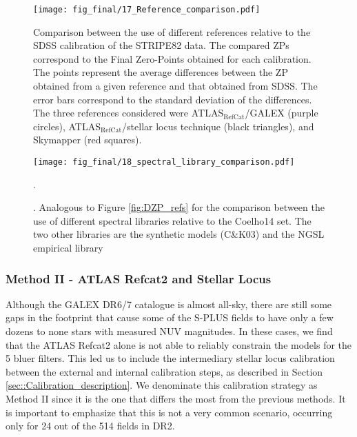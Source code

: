 \documentclass[fleqn,usenatbib]{mnras}
\begin{document}
\begin{figure}
\begin{center}
\texttt{[image: fig\_final/17\_Reference\_comparison.pdf]}
\caption{\label{fig:DZP_refs} Comparison between the use of different references relative to the SDSS calibration of the STRIPE82 data. The compared ZPs correspond to the Final Zero-Points obtained for each calibration. The points represent the average differences between the ZP obtained from a given reference and that obtained from SDSS. The error bars correspond to the standard deviation of the differences. The three references considered were ATLAS$_\mathrm{RefCat}$/GALEX (purple circles), ATLAS$_\mathrm{RefCat}$/stellar locus technique (black triangles), and Skymapper (red squares).}
\label{fig:ref_comp_final}
\end{center}
\end{figure}

\begin{figure}
\begin{center}
\texttt{[image: fig\_final/18\_spectral\_library\_comparison.pdf]}
\caption{\label{fig:DZP_models}. Analogous to Figure \ref{fig:DZP_refs} for the comparison between the use of different spectral libraries relative to the Coelho14 set. The two other libraries are the \citep{Castelli+Kurucz2003} synthetic models (C\&K03) and the NGSL empirical library}.
\label{fig:mod_comp_partial}
\end{center}
\end{figure}

\subsubsection{Method II - ATLAS Refcat2 and Stellar Locus}

Although the GALEX DR6/7 catalogue is almost all-sky, there are still some gaps in the footprint that cause some of the S-PLUS fields to have only a few dozens to none stars with measured NUV magnitudes. In these cases, we find that the ATLAS Refcat2 alone is not able to reliably constrain the models for the 5 bluer filters. This led us to include the intermediary stellar locus calibration between the external and internal calibration steps, as described in Section \ref{sec::Calibration_description}. We denominate this calibration strategy as Method II since it is the one that differs the most from the previous methods. It is important to emphasize that this is not a very common scenario, occurring only for 24 out of the 514 fields in DR2.
\end{document}
